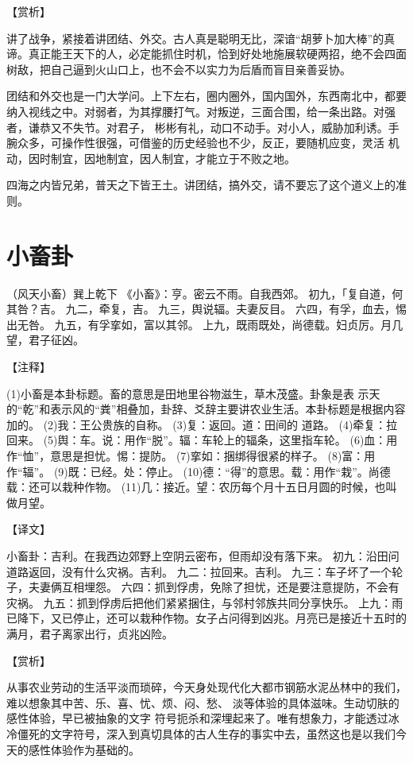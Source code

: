 \documentclass[a4paper,12pt,UTF8,twoside]{ctexbook}
\begin{document}
【赏析】

讲了战争，紧接着讲团结、外交。古人真是聪明无比，深谙“胡萝卜加大棒”的真谛。真正能王天下的人，必定能抓住时机，恰到好处地施展软硬两招，绝不会四面树敌，把自己逼到火山口上，也不会不以实力为后盾而盲目亲善妥协。

团结和外交也是一门大学问。上下左右，圈内圈外，国内国外，东西南北中，都要纳入视线之中。对弱者，为其撑腰打气。对叛逆，三面合围，给一条出路。对强者，谦恭又不失节。对君子， 彬彬有礼，动口不动手。对小人，威胁加利诱。手腕众多，可操作性很强，可借鉴的历史经验也不少，反正，要随机应变，灵活 机动，因时制宜，因地制宜，因人制宜，才能立于不败之地。

四海之内皆兄弟，普天之下皆王土。讲团结，搞外交，请不要忘了这个道义上的准则。

\chapter{小畜卦}

（风天小畜）巽上乾下
《小畜》：亨。密云不雨。自我西郊。
初九，「复自道，何其咎？吉。
九二，牵复，吉。
九三，舆说辐。夫妻反目。
六四，有孚，血去，惕出无咎。
九五，有孚挛如，富以其邻。
上九，既雨既处，尚德载。妇贞厉。月几望，君子征凶。

【注释】

(1)小畜是本卦标题。畜的意思是田地里谷物滋生，草木茂盛。卦象是表 示天的“乾”和表示风的“粪”相叠加，卦辞、爻辞主要讲农业生活。本卦标题是根据内容加的。
(2)我：王公贵族的自称。
(3)复：返回。道：田间的 道路。
(4)牵复：拉回来。
(5)舆：车。说：用作“脱”。辐：车轮上的辐条，这里指车轮。
(6)血：用作“恤”，意思是担忧。惕：提防。
(7)挛如：捆绑得很紧的样子。
(8)富：用作“辐”。
(9)既：已经。处：停止。
(10)德：“得”的意思。载：用作“栽”。尚德载：还可以栽种作物。
(11)几：接近。望：农历每个月十五日月圆的时候，也叫做月望。

【译文】

小畜卦：吉利。在我西边郊野上空阴云密布，但雨却没有落下来。
初九：沿田问道路返回，没有什么灾祸。吉利。
九二：拉回来。吉利。
九三：车子坏了一个轮子，夫妻俩互相埋怨。
六四：抓到俘虏，免除了担忧，还是要注意提防，不会有灾祸。
九五：抓到俘虏后把他们紧紧捆住，与邻村邻族共同分享快乐。
上九：雨已降下，又已停止，还可以栽种作物。女子占问得到凶兆。月亮已是接近十五时的满月，君子离家出行，贞兆凶险。

【赏析】

从事农业劳动的生活平淡而琐碎，今天身处现代化大都市钢筋水泥丛林中的我们，难以想象其中苦、乐、喜、忧、烦、闷、愁、 淡等体验的具体滋味。生动切肤的感性体验，早已被抽象的文字 符号扼杀和深埋起来了。唯有想象力，才能透过冰冷僵死的文字符号，深入到真切具体的古人生存的事实中去，虽然这也是以我们今天的感性体验作为基础的。
\end{document}
